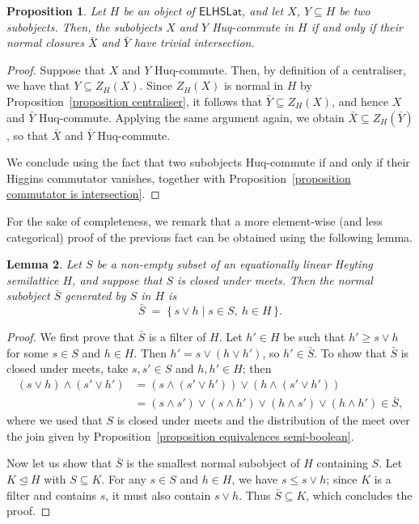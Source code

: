 \documentclass[reqno,a4paper]{amsart}
\newtheorem{lemma}{Lemma}[section]
\newtheorem{proposition}[lemma]{Proposition}
\theoremstyle{remark}
\theoremstyle{definition}
\newcommand{\oleq}{\subseteq} %
\newcommand{\normal}{\trianglelefteq} %
\newcommand{\ELHSLat}{\ensuremath{\mathsf{ELHSLat}}}
\begin{document}
\begin{proposition}\label{proposition elhslat huq}
	Let \(H\) be an object of \(\ELHSLat\), and let \(X\), \(Y \oleq H\) be two subobjects. Then, the subobjects \(X\) and \(Y\) Huq-commute in \(H\) if and only if their normal closures \(\bar X\) and \(\bar Y\) have trivial intersection.
\end{proposition}
\begin{proof}
	Suppose that \(X\) and \(Y\) Huq-commute. Then, by definition of a centraliser, we have that \(Y \oleq Z_H(X)\). Since \(Z_H(X)\) is normal in \(H\) by Proposition~\ref{proposition centraliser}, it follows that \(\bar Y \oleq Z_H(X)\), and hence \(X\) and \(\bar Y\) Huq-commute.
	Applying the same argument again, we obtain \(\bar X \oleq Z_H(\bar Y)\), so that \(\bar X\) and \(\bar Y\) Huq-commute.

	We conclude using the fact that two subobjects Huq-commute if and only if their Higgins commutator vanishes, together with Proposition~\ref{proposition commutator is intersection}.
\end{proof}

For the sake of completeness, we remark that a more element-wise (and less categorical) proof of the previous fact can be obtained using the following lemma.

\begin{lemma}
	Let \(S\) be a non-empty subset of an equationally linear Heyting semilattice \(H\), and suppose that \(S\) is closed under meets.
	Then the normal subobject \( \bar S \) generated by \(S\) in \(H\) is
	\[
		\bar S \;=\; \{\, s \vee h \mid s \in S,\ h \in H \,\}.
	\]
\end{lemma}
\begin{proof}
	We first prove that \(\bar S\) is a filter of \(H\).
	Let \(h' \in H\) be such that \(h' \ge s \vee h\) for some \(s\in S\) and \(h\in H\).
	Then \(h' = s \vee (h \vee h')\), so \(h'\in \bar S\).
	To show that \(\bar S\) is closed under meets, take \(s,s'\in S\) and \(h,h'\in H\); then
	\begin{align*}
		(s\vee h) \wedge (s'\vee h')
		 & = (s\wedge(s'\vee h')) \vee (h \wedge (s'\vee h'))                               \\
		 & = (s\wedge s') \vee (s\wedge h') \vee (h\wedge s') \vee (h\wedge h') \in \bar S,
	\end{align*}
	where we used that \(S\) is closed under meets and the distribution of the meet over the join given by Proposition~\ref{proposition equivalences semi-boolean}.

	Now let us show that \(\bar S\) is the smallest normal subobject of \(H\) containing \(S\).
	Let \(K \normal H\) with \(S \oleq K\).
	For any \(s\in S\) and \(h\in H\), we have \(s \le s\vee h\); since \(K\) is a filter and contains \(s\), it must also contain \(s\vee h\).
	Thus \(\bar S \oleq K\), which concludes the proof.
\end{proof}
\end{document}
